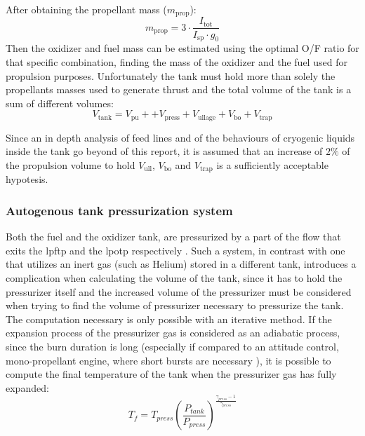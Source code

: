 
After obtaining the propellant mass ($m_{\text{prop}}$):
\begin{equation} 
m_{\text{prop}} = 3 \cdot \frac{I_{\text{tot}}}{I_{\text{sp}} \cdot g_0}
\end{equation}
Then the oxidizer and fuel mass can be estimated using the optimal O/F ratio for that specific combination, finding the mass of the oxidizer and the fuel used for propulsion purposes.
Unfortunately the tank must hold more than solely the propellants masses used to generate thrust and the total volume of the tank is a sum of different volumes:
\begin{equation}
V_{\text{tank}} = V_{\text{pu}} + + V_{\text{press}} +V_{\text{ullage}} + V_{\text{bo}} + V_{\text{trap}} 
\end{equation}

Since an in depth analysis of feed lines and of the behaviours of cryogenic liquids inside the tank go beyond of this report, it is assumed that an increase of $2\%$ of the propulsion volume to hold $V_{\text{ull}}$, $V_{\text{bo}}$ and $V_{\text{trap}}$ is a sufficiently acceptable hypotesis.

\subsubsection{Autogenous tank pressurization system}
Both the fuel and the oxidizer tank, are pressurized by a part of the flow that exits the \acrshort{lpftp} and the \acrshort{lpotp} respectively \cite{presentation}. 
Such a system, in contrast with one that utilizes an inert gas (such as Helium) stored in a different tank, introduces a complication when calculating the volume of the tank, since it has to hold the pressurizer itself and the increased volume of the pressurizer must be considered when trying to find the volume of pressurizer necessary to pressurize the tank. 
The computation necessary is only possible with an iterative method. 
If the expansion process of the pressurizer gas is considered as an adiabatic process, since the burn duration is long (especially if compared to an attitude control, mono-propellant engine, where short bursts are necessary \cite{humble95}), it is possible to compute the final temperature of the tank when the pressurizer gas has fully expanded:
\begin{equation}
    T_f = T_{press} (\frac{P_{tank}}{P_{press}}) ^{\frac{\gamma_{press}-1}{\gamma_{press}}}
\end{equation}

